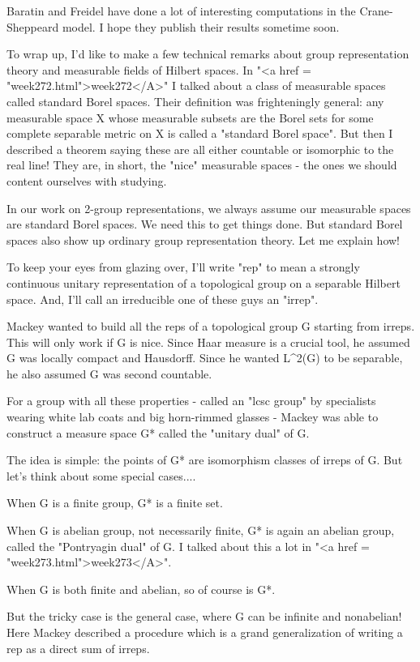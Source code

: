 Baratin and Freidel have done a lot of interesting computations 
in the Crane-Sheppeard model.  I hope they publish their results
sometime soon.

To wrap up, I'd like to make a few technical remarks about group
representation theory and measurable fields of Hilbert spaces.  In
"<a href = "week272.html">week272</A>" I talked about a
class of measurable spaces called standard Borel spaces.  Their
definition was frighteningly general: any measurable space X whose
measurable subsets are the Borel sets for some complete separable
metric on X is called a "standard Borel space".  But then I
described a theorem saying these are all either countable or
isomorphic to the real line!  They are, in short, the "nice"
measurable spaces - the ones we should content ourselves with studying.

In our work on 2-group representations, we always assume our 
measurable spaces are standard Borel spaces.  We need this to get
things done.  But standard Borel spaces also show up ordinary group 
representation theory.  Let me explain how!

To keep your eyes from glazing over, I'll write "rep" to
mean a strongly continuous unitary representation of a topological
group on a separable Hilbert space.  And, I'll call an irreducible one
of these guys an "irrep".

Mackey wanted to build all the reps of a topological group G starting
from irreps.  This will only work if G is nice.  Since Haar measure is
a crucial tool, he assumed G was locally compact and Hausdorff.  Since
he wanted L^{2}(G) to be separable, he also assumed G was
second countable.
 
For a group with all these properties - called an "lcsc
group" by specialists wearing white lab coats and big horn-rimmed
glasses - Mackey was able to construct a measure space G* called the
"unitary dual" of G.

The idea is simple: the points of G* are isomorphism classes of 
irreps of G.   But let's think about some special cases....

When G is a finite group, G* is a finite set.  

When G is abelian group, not necessarily finite, G* is again an
abelian group, called the "Pontryagin dual" of G.  I talked
about this a lot in "<a href = "week273.html">week273</A>".

When G is both finite and abelian, so of course is G*. 

But the tricky case is the general case, where G can be infinite and
nonabelian!  Here Mackey described a procedure which is a grand
generalization of writing a rep as a direct sum of irreps.

